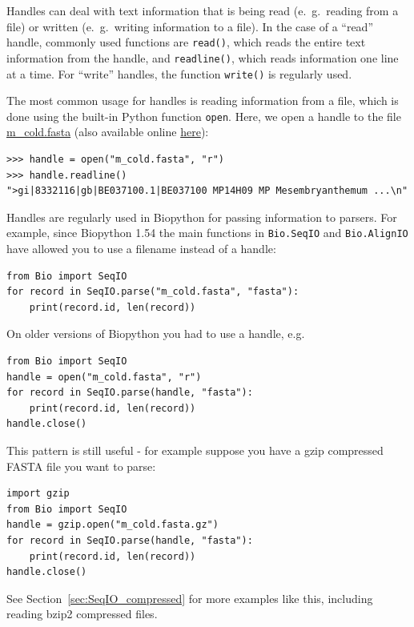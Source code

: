 \documentclass{report}
\begin{document}
Handles can deal with text information that is being read (e.~g.~reading
from a file) or written (e.~g.~writing information to a file). In the
case of a ``read'' handle, commonly used functions are \verb|read()|,
which reads the entire text information from the handle, and
\verb|readline()|, which reads information one line at a time. For
``write'' handles, the function \verb|write()| is regularly used.

The most common usage for handles is reading information from a file,
which is done using the built-in Python function \verb|open|. Here, we open a
handle to the file \href{examples/m\_cold.fasta}{m\_cold.fasta}
(also available online
\href{http://biopython.org/DIST/docs/tutorial/examples/m\_cold.fasta}{here}):

\begin{verbatim}
>>> handle = open("m_cold.fasta", "r")
>>> handle.readline()
">gi|8332116|gb|BE037100.1|BE037100 MP14H09 MP Mesembryanthemum ...\n"
\end{verbatim}

Handles are regularly used in Biopython for passing information to parsers.
For example, since Biopython 1.54 the main functions in \verb|Bio.SeqIO|
and \verb|Bio.AlignIO| have allowed you to use a filename instead of a
handle:

\begin{verbatim}
from Bio import SeqIO
for record in SeqIO.parse("m_cold.fasta", "fasta"):
    print(record.id, len(record))
\end{verbatim}

On older versions of Biopython you had to use a handle, e.g.

\begin{verbatim}
from Bio import SeqIO
handle = open("m_cold.fasta", "r")
for record in SeqIO.parse(handle, "fasta"):
    print(record.id, len(record))
handle.close()
\end{verbatim}

This pattern is still useful - for example suppose you have a gzip
compressed FASTA file you want to parse:

\begin{verbatim}
import gzip
from Bio import SeqIO
handle = gzip.open("m_cold.fasta.gz")
for record in SeqIO.parse(handle, "fasta"):
    print(record.id, len(record))
handle.close()
\end{verbatim}

See Section~\ref{sec:SeqIO_compressed} for more examples like this,
including reading bzip2 compressed files.
\end{document}
